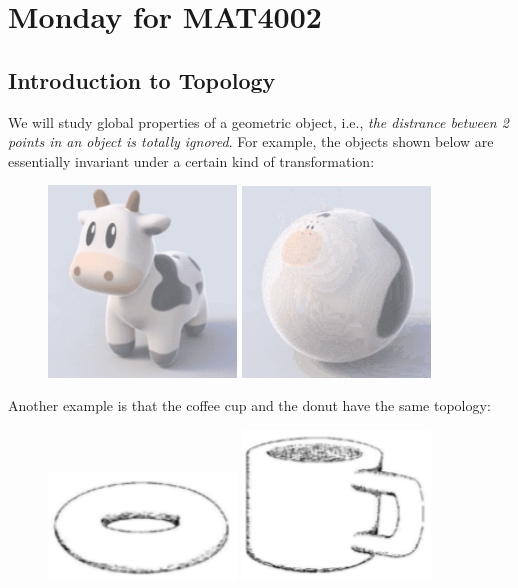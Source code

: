 \section{Monday for MAT4002}

\subsection{Introduction to Topology}
We will study global properties of a geometric object, i.e., \textit{the distrance between 2 points in an object is totally ignored}. For example, the objects shown below are essentially invariant under a certain kind of transformation:
\begin{figure}[H]
\centering
\includegraphics[width=5cm]{week1/f_2_1}
\includegraphics[width=5cm]{week1/f_2_2}
\end{figure}
Another example is that the coffee cup and the donut have the same topology:
 \begin{figure}[H]
\centering
\includegraphics[width=5cm]{week1/f_2_3}
\includegraphics[width=5cm]{week1/f_2_4}
\end{figure}
